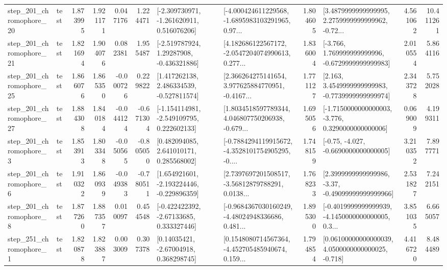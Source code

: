 \begin{tabular}{llrrrrllrlrr}
  step\_201\_chromophore\_20 &      test &      1.873995 &    1.921171 &      0.047176 &  1.224471 &   [-2.309730971, -1.261620911, 0.516076206] &  [-4.000424611229568, -1.6895983103291965, 0.97... &       1.804605 &  [3.4879999999999995, 2.2759999999999962, -0.72... &            4.561062 &         10.411261 \\
  step\_201\_chromophore\_21 &      test &      1.821694 &    1.904076 &      0.082381 &  1.955487 &    [-2.519787924, 1.29287908, -0.436321886] &  [4.182686122567172, -2.0547204074990613, 0.277... &       1.836004 &   [-3.766, 1.769999999999996, -0.6729999999999983] &            2.010554 &          5.864116 \\
  step\_201\_chromophore\_25 &      test &      1.866076 &    1.865350 &     -0.000726 &  0.229822 &    [1.417262138, 2.486334539, -0.527811574] &  [2.366264275141654, 3.977625884770951, -0.4167... &       1.771127 &   [2.163, 3.4549999999999983, -0.7739999999999974] &            2.343728 &          5.752028 \\
  step\_201\_chromophore\_27 &      test &      1.884308 &    1.840184 &     -0.044124 & -0.671304 &   [-1.154114981, -2.549109795, 0.222602133] &  [1.8034518597789344, 4.046807750206938, -0.679... &       1.695056 &  [-1.7150000000000003, -3.776, 0.3290000000000006] &            0.069009 &          4.199311 \\
   step\_201\_chromophore\_3 &      test &      1.853913 &    1.803348 &     -0.050565 & -0.805050 &     [0.482094085, 2.641010171, 0.285568002] &  [-0.7884294119915672, -4.3528101754905295, -0.... &       1.748159 &               [-0.75, -4.027, -0.6690000000000005] &            3.210352 &          7.897771 \\
   step\_201\_chromophore\_6 &      test &      1.910322 &    1.860939 &     -0.049383 & -0.780511 &   [1.654921601, -2.193224446, -0.229896359] &  [2.7397697201508517, -3.56812879788291, 0.0138... &       1.768233 &  [2.3999999999999986, -3.37, -0.49099999999999966] &            2.531827 &          7.242151 \\
   step\_201\_chromophore\_8 &      test &      1.877260 &    1.887357 &      0.010097 &  0.454548 &    [-0.422422392, -2.67133685, 0.333327446] &  [-0.9684367030160249, -4.48024948336686, 0.481... &       1.895300 &  [-0.4019999999999939, -4.1450000000000005, 0.3... &            3.851035 &          6.665057 \\
   step\_251\_chromophore\_1 &      test &      1.820878 &    1.823887 &      0.003009 &  0.307378 &      [0.14035421, -2.67004918, 0.368298745] &  [0.1548080714567364, -4.452705485940674, 0.159... &       1.794854 &  [0.06100000000000039, 4.0500000000000025, -0.718] &            4.416720 &          8.484489 \\

\end{tabular}
